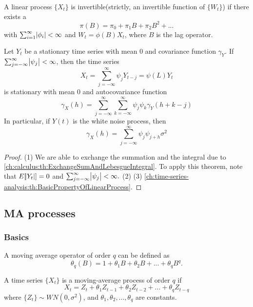 \begin{definition}[invertibility]\label{ch:time-series-analysis:def:invertibility}
A linear process $\{X_t\}$ is invertible(strictly, an invertible function of $\{W_t\}$) if there exists a $$\pi(B) = \pi_0 + \pi_1 B + \pi_2 B^2 + ...$$
with $\sum_{i=1}^\infty \abs{\phi_i} < \infty$ and $W_t = \phi(B)X_t$, where $B$ is the lag operator.
\end{definition}





\begin{theorem}\label{ch:time-series-analysis:th:linearcombinationstationary}\cite[52]{brockwell2002introduction}
Let $Y_t$ be a stationary time series with mean 0 and covariance function $\gamma_Y$. If $\sum_{j=-\infty}^\infty \abs{\psi_j} < \infty$, then the time series
$$X_t = \sum_{j=-\infty}^\infty \psi_j Y_{t-j} = \psi(L)Y_t$$
is stationary with mean 0 and autocovariance function
$$\gamma_X(h) = \sum_{j=-\infty}^\infty\sum_{k=-\infty}^\infty \psi_j\psi_k\gamma_Y(h+k-j)$$
In particular, if $Y(t)$ is the white noise process, then
$$\gamma_X(h) = \sum_{j=-\infty}^\infty \psi_j\psi_{j+h}\sigma^2$$
\end{theorem}
\begin{proof}
(1) We are able to exchange the summation and the integral due to \autoref{ch:calculus:th:ExchangeSumAndLebesgueIntegral}. To apply this theorem, note that $E[\abs{Y_t}] = 0$ and  $\sum_{j=-\infty}^\infty \abs{\psi_j} < \infty.$
(2)
(3) \autoref{ch:time-series-analysis:th:BasicPropertyOfLinearProcess}.
\end{proof}

\subsection{MA processes}
\subsubsection{Basics}
\begin{definition}
\cite[10]{box2015time} A moving average operator of order $q$ can be defined as
$$\theta_q(B) = 1+\theta_1B+\theta_2B+...+\theta_qB^q.$$
\end{definition}


\begin{definition}[MA(q) process]
\cite[50]{brockwell2002introduction}
A time series $\{X_t\}$ is a moving-average process of order $q$ if
$$X_t = Z_t + \theta_1 Z_{t-1} + \theta_2 Z_{t-2} + ... + \theta_q Z_{t-q}$$
where $\{Z_t\}\sim WN(0,\sigma^2)$, and $\theta_1,\theta_2,...,\theta_q$ are constants.
\end{definition}



